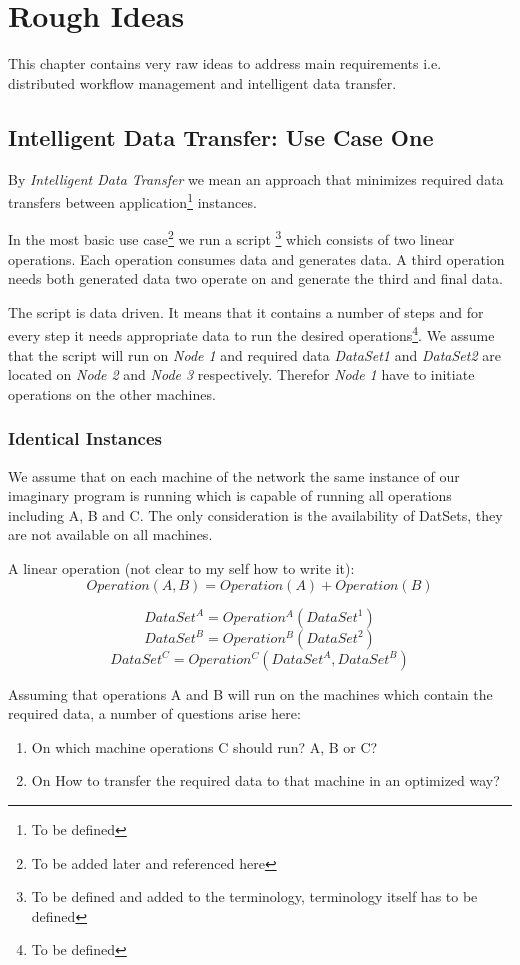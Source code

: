 \chapter{Rough Ideas}

This chapter contains very raw ideas to address main requirements i.e.
distributed workflow management and intelligent data transfer.

\section{Intelligent Data Transfer: Use Case One}
By \textit{Intelligent Data Transfer} we mean an approach that
minimizes required data transfers between application\footnote{To be defined}
instances.

In the most basic use case\footnote{To be added later and 
referenced here} we run a script
\footnote{To be defined and added to
the terminology, terminology itself has to be defined}
which consists of two linear operations. Each operation consumes data
and generates data. A third operation needs both generated data two 
operate on and generate the third and final data.

The script is data driven. It means that it contains a number
of steps and for every step it needs appropriate data to run the
desired operations\footnote{To be defined}. We assume that
the script will run on \textit{Node 1} and required data 
\textit{DataSet1} and \textit{DataSet2} are 
located on \textit{Node 2}
and \textit{Node 3} respectively. Therefor \textit{Node 1} have
to initiate operations on the other machines.

\subsection{Identical Instances}
We assume that on each machine of the network the same instance of our
imaginary program is running which is capable of running all operations
including A, B and C. The only consideration is the availability of 
DatSets, they are not available on all machines.

A linear operation (not clear to my self how to write it):
\[ Operation(A, B) = Operation(A) + Operation(B) \]

\[ DataSet^A = Operation^A(DataSet^1) \]
\[ DataSet^B = Operation^B(DataSet^2) \]
\[ DataSet^C = Operation^C(DataSet^A, DataSet^B) \]

Assuming that operations A and B will run on the machines which
contain the required data, a number of questions arise here:
\begin{enumerate}
\item On which machine operations C should run? A, B or C?
\item On How to transfer the required data to that machine in an 
optimized way?
\end{enumerate}

